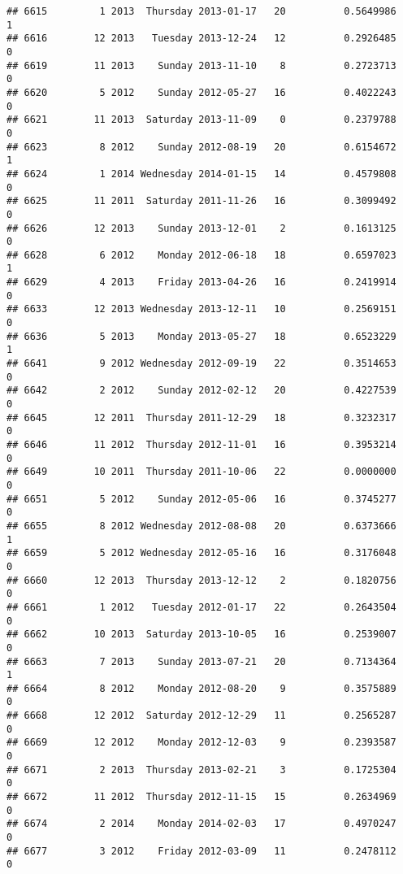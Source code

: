 \documentclass[
]{article}
\begin{document}
\begin{verbatim}
## 6615         1 2013  Thursday 2013-01-17   20          0.5649986             1
## 6616        12 2013   Tuesday 2013-12-24   12          0.2926485             0
## 6619        11 2013    Sunday 2013-11-10    8          0.2723713             0
## 6620         5 2012    Sunday 2012-05-27   16          0.4022243             0
## 6621        11 2013  Saturday 2013-11-09    0          0.2379788             0
## 6623         8 2012    Sunday 2012-08-19   20          0.6154672             1
## 6624         1 2014 Wednesday 2014-01-15   14          0.4579808             0
## 6625        11 2011  Saturday 2011-11-26   16          0.3099492             0
## 6626        12 2013    Sunday 2013-12-01    2          0.1613125             0
## 6628         6 2012    Monday 2012-06-18   18          0.6597023             1
## 6629         4 2013    Friday 2013-04-26   16          0.2419914             0
## 6633        12 2013 Wednesday 2013-12-11   10          0.2569151             0
## 6636         5 2013    Monday 2013-05-27   18          0.6523229             1
## 6641         9 2012 Wednesday 2012-09-19   22          0.3514653             0
## 6642         2 2012    Sunday 2012-02-12   20          0.4227539             0
## 6645        12 2011  Thursday 2011-12-29   18          0.3232317             0
## 6646        11 2012  Thursday 2012-11-01   16          0.3953214             0
## 6649        10 2011  Thursday 2011-10-06   22          0.0000000             0
## 6651         5 2012    Sunday 2012-05-06   16          0.3745277             0
## 6655         8 2012 Wednesday 2012-08-08   20          0.6373666             1
## 6659         5 2012 Wednesday 2012-05-16   16          0.3176048             0
## 6660        12 2013  Thursday 2013-12-12    2          0.1820756             0
## 6661         1 2012   Tuesday 2012-01-17   22          0.2643504             0
## 6662        10 2013  Saturday 2013-10-05   16          0.2539007             0
## 6663         7 2013    Sunday 2013-07-21   20          0.7134364             1
## 6664         8 2012    Monday 2012-08-20    9          0.3575889             0
## 6668        12 2012  Saturday 2012-12-29   11          0.2565287             0
## 6669        12 2012    Monday 2012-12-03    9          0.2393587             0
## 6671         2 2013  Thursday 2013-02-21    3          0.1725304             0
## 6672        11 2012  Thursday 2012-11-15   15          0.2634969             0
## 6674         2 2014    Monday 2014-02-03   17          0.4970247             0
## 6677         3 2012    Friday 2012-03-09   11          0.2478112             0

\end{verbatim}
\end{document}
